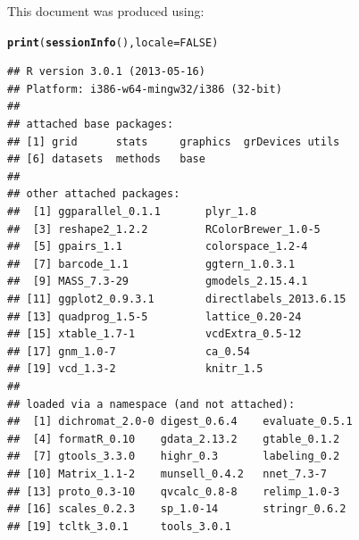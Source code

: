 \documentclass[11pt]{book}\usepackage[]{graphicx}\usepackage[]{color}
\makeatletter
\newcommand{\hlnum}[1]{\textcolor[rgb]{0.686,0.059,0.569}{#1}}%
\newcommand{\hlstd}[1]{\textcolor[rgb]{0.345,0.345,0.345}{#1}}%
\newcommand{\hlkwc}[1]{\textcolor[rgb]{0.333,0.667,0.333}{#1}}%
\newcommand{\hlkwd}[1]{\textcolor[rgb]{0.737,0.353,0.396}{\textbf{#1}}}%
\newenvironment{kframe}{%
 \def\at@end@of@kframe{}%
 \ifinner\ifhmode%
  \def\at@end@of@kframe{\end{minipage}}%
  \begin{minipage}{\columnwidth}%
 \fi\fi%
 \def\FrameCommand##1{\hskip\@totalleftmargin \hskip-\fboxsep
 \colorbox{shadecolor}{##1}\hskip-\fboxsep
     \hskip-\linewidth \hskip-\@totalleftmargin \hskip\columnwidth}%
 \MakeFramed {\advance\hsize-\width
   \@totalleftmargin\z@ \linewidth\hsize
   \@setminipage}}%
 {\par\unskip\endMakeFramed%
 \at@end@of@kframe}
\newenvironment{knitrout}{}{} %
\renewenvironment{knitrout}{\small\renewcommand{\baselinestretch}{.85}}{} %
\makeatother
\begin{document}
\printindex

\newpage
This document was produced using:

\begin{knitrout}
\color{fgcolor}\begin{kframe}
\begin{alltt}
\hlkwd{print}\hlstd{(}\hlkwd{sessionInfo}\hlstd{(),} \hlkwc{locale} \hlstd{=} \hlnum{FALSE}\hlstd{)}
\end{alltt}
\begin{verbatim}
## R version 3.0.1 (2013-05-16)
## Platform: i386-w64-mingw32/i386 (32-bit)
## 
## attached base packages:
## [1] grid      stats     graphics  grDevices utils    
## [6] datasets  methods   base     
## 
## other attached packages:
##  [1] ggparallel_0.1.1       plyr_1.8              
##  [3] reshape2_1.2.2         RColorBrewer_1.0-5    
##  [5] gpairs_1.1             colorspace_1.2-4      
##  [7] barcode_1.1            ggtern_1.0.3.1        
##  [9] MASS_7.3-29            gmodels_2.15.4.1      
## [11] ggplot2_0.9.3.1        directlabels_2013.6.15
## [13] quadprog_1.5-5         lattice_0.20-24       
## [15] xtable_1.7-1           vcdExtra_0.5-12       
## [17] gnm_1.0-7              ca_0.54               
## [19] vcd_1.3-2              knitr_1.5             
## 
## loaded via a namespace (and not attached):
##  [1] dichromat_2.0-0 digest_0.6.4    evaluate_0.5.1 
##  [4] formatR_0.10    gdata_2.13.2    gtable_0.1.2   
##  [7] gtools_3.3.0    highr_0.3       labeling_0.2   
## [10] Matrix_1.1-2    munsell_0.4.2   nnet_7.3-7     
## [13] proto_0.3-10    qvcalc_0.8-8    relimp_1.0-3   
## [16] scales_0.2.3    sp_1.0-14       stringr_0.6.2  
## [19] tcltk_3.0.1     tools_3.0.1
\end{verbatim}
\end{kframe}
\end{knitrout}


	
\end{document}
